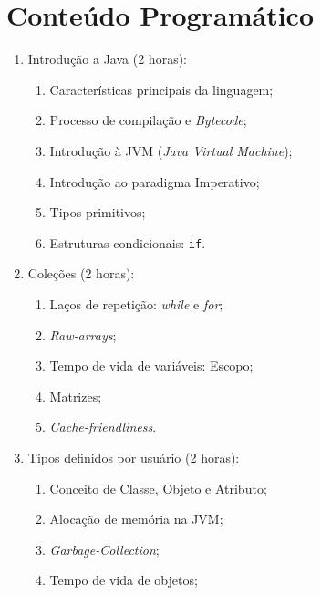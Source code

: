 \documentclass{article}
\begin{document}
\section{Conteúdo Programático}

\begin{enumerate}
    \item Introdução a Java (2 horas):
        \begin{samepage}
            \begin{enumerate}
                \item Características principais da linguagem;
                \item Processo de compilação e \textit{Bytecode};
                \item Introdução à JVM (\textit{Java Virtual Machine});
                \item Introdução ao paradigma Imperativo;
                \item Tipos primitivos;
                \item Estruturas condicionais: \texttt{if}.
            \end{enumerate}
        \end{samepage}
    \item Coleções (2 horas):
        \begin{samepage}
            \begin{enumerate}
                \item Laços de repetição: \textit{while} e \textit{for};
                \item \textit{Raw-arrays};
                \item Tempo de vida de variáveis: Escopo;
                \item Matrizes;
                \item \textit{Cache-friendliness}.
            \end{enumerate}
        \end{samepage}
    \item Tipos definidos por usuário (2 horas):
        \begin{samepage}
            \begin{enumerate}
                \item Conceito de Classe, Objeto e Atributo;
                \item Alocação de memória na JVM\@;
                \item \textit{Garbage-Collection};
                \item Tempo de vida de objetos;

\end{enumerate}
\end{samepage}
\end{enumerate}
\end{document}
